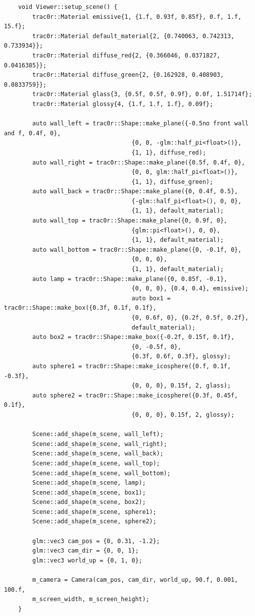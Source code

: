 \documentclass[
  twoside,
  11pt, a4paper,
  footinclude=true,
  headinclude=true,
  cleardoublepage=empty
]{scrreprt}
\begin{document}
\begin{verbatim}
    void Viewer::setup_scene() {
        trac0r::Material emissive{1, {1.f, 0.93f, 0.85f}, 0.f, 1.f, 15.f};
        trac0r::Material default_material{2, {0.740063, 0.742313, 0.733934}};
        trac0r::Material diffuse_red{2, {0.366046, 0.0371827, 0.0416385}};
        trac0r::Material diffuse_green{2, {0.162928, 0.408903, 0.0833759}};
        trac0r::Material glass{3, {0.5f, 0.5f, 0.9f}, 0.0f, 1.51714f};
        trac0r::Material glossy{4, {1.f, 1.f, 1.f}, 0.09f};

        auto wall_left = trac0r::Shape::make_plane({-0.5no front wall and f, 0.4f, 0},
                                    {0, 0, -glm::half_pi<float>()},
                                    {1, 1}, diffuse_red);
        auto wall_right = trac0r::Shape::make_plane({0.5f, 0.4f, 0},
                                    {0, 0, glm::half_pi<float>()},
                                    {1, 1}, diffuse_green);
        auto wall_back = trac0r::Shape::make_plane({0, 0.4f, 0.5},
                                    {-glm::half_pi<float>(), 0, 0},
                                    {1, 1}, default_material);
        auto wall_top = trac0r::Shape::make_plane({0, 0.9f, 0},
                                    {glm::pi<float>(), 0, 0},
                                    {1, 1}, default_material);
        auto wall_bottom = trac0r::Shape::make_plane({0, -0.1f, 0},
                                    {0, 0, 0},
                                    {1, 1}, default_material);
        auto lamp = trac0r::Shape::make_plane({0, 0.85f, -0.1},
                                    {0, 0, 0}, {0.4, 0.4}, emissive);
                                    auto box1 = trac0r::Shape::make_box({0.3f, 0.1f, 0.1f},
                                    {0, 0.6f, 0}, {0.2f, 0.5f, 0.2f},
                                    default_material);
        auto box2 = trac0r::Shape::make_box({-0.2f, 0.15f, 0.1f},
                                    {0, -0.5f, 0},
                                    {0.3f, 0.6f, 0.3f}, glossy);
        auto sphere1 = trac0r::Shape::make_icosphere({0.f, 0.1f, -0.3f},
                                    {0, 0, 0}, 0.15f, 2, glass);
        auto sphere2 = trac0r::Shape::make_icosphere({0.3f, 0.45f, 0.1f},
                                    {0, 0, 0}, 0.15f, 2, glossy);

        Scene::add_shape(m_scene, wall_left);
        Scene::add_shape(m_scene, wall_right);
        Scene::add_shape(m_scene, wall_back);
        Scene::add_shape(m_scene, wall_top);
        Scene::add_shape(m_scene, wall_bottom);
        Scene::add_shape(m_scene, lamp); 
        Scene::add_shape(m_scene, box1);
        Scene::add_shape(m_scene, box2);
        Scene::add_shape(m_scene, sphere1);
        Scene::add_shape(m_scene, sphere2);

        glm::vec3 cam_pos = {0, 0.31, -1.2};
        glm::vec3 cam_dir = {0, 0, 1};
        glm::vec3 world_up = {0, 1, 0};

        m_camera = Camera(cam_pos, cam_dir, world_up, 90.f, 0.001, 100.f,
        m_screen_width, m_screen_height);
    }
\end{verbatim} 
\end{document}
